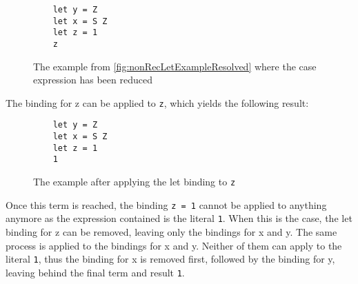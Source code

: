 \begin{figure}[!ht]
\begin{verbatim}
    let y = Z
    let x = S Z
    let z = 1
    z
\end{verbatim}
    \caption{The example from \ref*{fig:nonRecLetExampleResolved} where the case expression has been reduced}
\end{figure}

The binding for z can be applied to \texttt{z}, which yields the following result:

\begin{figure}[!ht]
\begin{verbatim}
    let y = Z
    let x = S Z
    let z = 1
    1
\end{verbatim}
    \caption{The example after applying the let binding to \texttt{z}}
\end{figure}

Once this term is reached, the binding \texttt{z = 1} cannot be applied to anything anymore as the expression contained is the literal \texttt{1}.
When this is the case, the let binding for z can be removed, leaving only the bindings for x and y.
The same process is applied to the bindings for x and y.
Neither of them can apply to the literal \texttt{1},
thus the binding for x is removed first, followed by the binding for y,
leaving behind the final term and result \texttt{1}.
